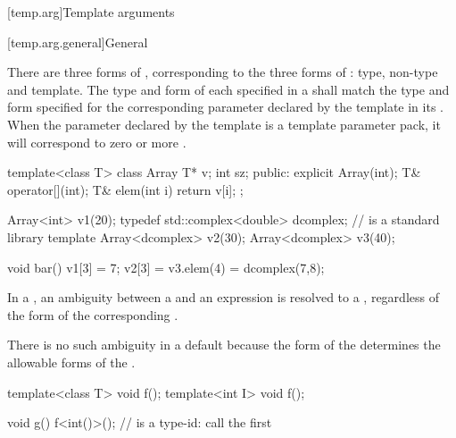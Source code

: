[temp.arg]{Template arguments}

[temp.arg.general]{General}

\pnum
{}%
There are three forms of
,
corresponding to the three forms of
:
type, non-type and template.
The type and form of each
specified in a
shall match the type and form specified for the corresponding
parameter declared by the template in its
.
When the parameter declared by the template is a template
parameter pack, it will correspond to zero or more
.
\begin{example}
\begin{codeblock}
template<class T> class Array {
  T* v;
  int sz;
public:
  explicit Array(int);
  T& operator[](int);
  T& elem(int i) { return v[i]; }
};

Array<int> v1(20);
typedef std::complex<double> dcomplex;  //  is a standard library template
Array<dcomplex> v2(30);
Array<dcomplex> v3(40);

void bar() {
  v1[3] = 7;
  v2[3] = v3.elem(4) = dcomplex(7,8);
}
\end{codeblock}
\end{example}

\pnum
In a
,
an ambiguity between a
and an expression is resolved to a
,
regardless of the form of the corresponding
.
\begin{footnote}
There is no such ambiguity in a default
because the form of the
determines the allowable forms of the
.
\end{footnote}
\begin{example}
\begin{codeblock}
template<class T> void f();
template<int I> void f();

void g() {
  f<int()>();       //  is a type-id: call the first 
}
\end{codeblock}
\end{example}

